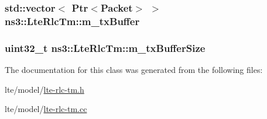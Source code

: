 \subsubsection[{\texorpdfstring{m\+\_\+tx\+Buffer}{m_txBuffer}}]{\setlength{\rightskip}{0pt plus 5cm}std\+::vector$<$ {\bf Ptr}$<${\bf Packet}$>$ $>$ ns3\+::\+Lte\+Rlc\+Tm\+::m\+\_\+tx\+Buffer\hspace{0.3cm}{\ttfamily [private]}}\hypertarget{classns3_1_1LteRlcTm_a01ff97b4fb7201dd3feeab5a07703cbf}{}\label{classns3_1_1LteRlcTm_a01ff97b4fb7201dd3feeab5a07703cbf}
\subsubsection[{\texorpdfstring{m\+\_\+tx\+Buffer\+Size}{m_txBufferSize}}]{\setlength{\rightskip}{0pt plus 5cm}uint32\+\_\+t ns3\+::\+Lte\+Rlc\+Tm\+::m\+\_\+tx\+Buffer\+Size\hspace{0.3cm}{\ttfamily [private]}}\hypertarget{classns3_1_1LteRlcTm_a8be5f1fa70a1c3f6f13450a46e2d34a3}{}\label{classns3_1_1LteRlcTm_a8be5f1fa70a1c3f6f13450a46e2d34a3}


The documentation for this class was generated from the following files\+:\begin{DoxyCompactItemize}
\item 
lte/model/\hyperlink{lte-rlc-tm_8h}{lte-\/rlc-\/tm.\+h}\item 
lte/model/\hyperlink{lte-rlc-tm_8cc}{lte-\/rlc-\/tm.\+cc}\end{DoxyCompactItemize}
